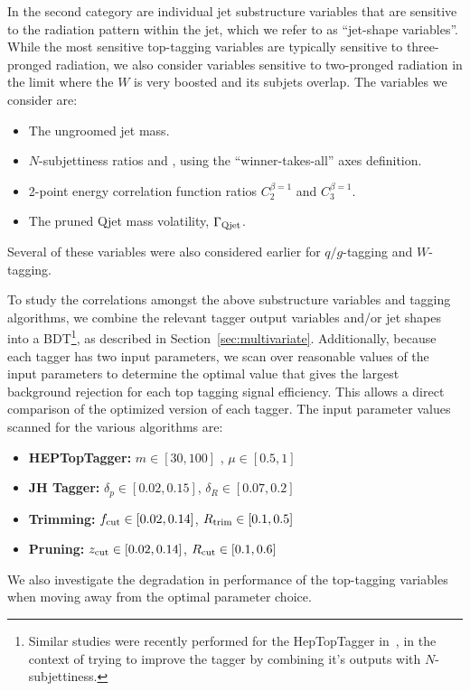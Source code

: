 In the second category are individual jet substructure variables that are sensitive to the radiation pattern within the jet, which we refer to as ``jet-shape variables''. While the most sensitive top-tagging variables are typically sensitive to three-pronged radiation, we also consider variables sensitive to two-pronged radiation in the limit where the $W$ is very boosted and its subjets overlap. The variables we consider are:
%
\begin{itemize}
\item The ungroomed jet mass.
\item $N$-subjettiness ratios \tautwoone and \tauthreetwo, using the ``winner-takes-all'' axes definition.
\item 2-point energy correlation function ratios $C_2^{\beta=1}$ and $C_3^{\beta=1}$.
\item The pruned Qjet mass volatility, $\Gamma_{\rm Qjet}$.
\end{itemize}
%
Several of these variables were also considered earlier for $q/g$-tagging and $W$-tagging.

To study the correlations amongst the above substructure variables and tagging algorithms,
we combine the relevant tagger output variables and/or jet shapes into a BDT\footnote{Similar studies were recently performed for the HepTopTagger in~\cite{Anders:2013oga}, in the context of trying to improve the tagger by combining it's outputs with $N$-subjettiness.}, as described in Section~\ref{sec:multivariate}. 
Additionally, because each tagger has two input parameters, we scan over reasonable values of the input parameters to determine the optimal value that gives the largest background rejection for each top tagging signal efficiency. This allows a direct comparison of the optimized version of each tagger. The input parameter values scanned for the various algorithms are:
%
\begin{itemize}
\item {\bf HEPTopTagger:} $m\in[30,100]$ \GeV, $\mu\in[0.5,1]$
\item {\bf JH Tagger:} $\delta_p\in[0.02,0.15]$, $\delta_R\in[0.07,0.2]$
\item {\bf Trimming:} $f_{\rm cut}\in[0.02,0.14]$, $R_{\rm trim}\in[0.1,0.5]$
\item {\bf Pruning:} $z_{\rm cut}\in[0.02,0.14]$, $R_{\rm cut}\in[0.1,0.6]$
\end{itemize}
%
We also investigate the degradation in performance of the top-tagging variables when moving away from the optimal parameter choice.

